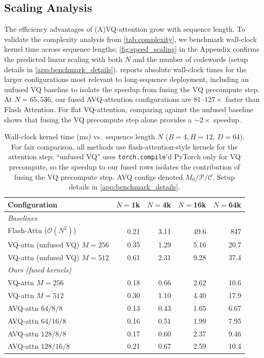 \subsection{Scaling Analysis}
\label{sec:exp_scaling}
The efficiency advantages of (A)VQ-attention grow with sequence length. To validate the complexity analysis from \cref{tab:complexity}, we benchmark wall-clock kernel time across sequence lengths; \cref{fig:speed_scaling} in the Appendix confirms the predicted linear scaling with both $N$ and the number of codewords (setup details in \cref{app:benchmark_details}).  reports absolute wall-clock times for the larger configurations most relevant to long-sequence deployment, including an unfused VQ baseline to isolate the speedup from fusing the VQ precompute step. At $N{=}65{,}536$, our fused AVQ-attention configurations are $81$--$127\times$ faster than Flash Attention. For flat VQ-attention, comparing against the unfused baseline shows that fusing the VQ precompute step alone provides a ${\sim}2\times$ speedup.
\begin{table}[h!]
\centering
\caption{Wall-clock kernel time (ms) vs.\ sequence length $N$ ($B{=}4,H{=}12$, $D{=}64$). For fair comparison, all methods use flash-attention-style kernels for the attention step; ``unfused VQ'' uses \texttt{torch.compile}'d PyTorch only for VQ precompute, so the speedup to our fused rows isolates the contribution of fusing the VQ precompute step. AVQ configs denoted $M_0/\mathcal{P}/\mathcal{C}$. Setup details in \cref{app:benchmark_details}.}
\label{tab:speed_scaling}
\begin{tabular}{lrrrr}
\toprule
\textbf{Configuration} & \multicolumn{1}{c}{$N{=}$1k} & \multicolumn{1}{c}{$N{=}$4k} & \multicolumn{1}{c}{$N{=}$16k} & \multicolumn{1}{c}{$N{=}$64k} \\
\midrule
\multicolumn{5}{l}{\textit{Baselines}} \\
Flash-Attn ($\mathcal{O}(N^2)$) & 0.21 & 3.11  & 49.6  & 847   \\
VQ-attn (unfused VQ) $M{=}256$ & 0.35 & 1.29  & 5.16  & 20.7  \\
VQ-attn (unfused VQ) $M{=}512$ & 0.61 & 2.31  & 9.28  & 37.4  \\
\midrule
\multicolumn{5}{l}{\textit{Ours (fused kernels)}} \\
VQ-attn $M{=}256$      & 0.18 & 0.66  & 2.62  & 10.6  \\
VQ-attn $M{=}512$      & 0.30 & 1.10  & 4.40  & 17.9  \\
AVQ-attn $64/8/8$      & 0.13 & 0.43  & 1.65  & 6.67  \\
AVQ-attn $64/16/8$     & 0.16 & 0.51  & 1.99  & 7.95  \\
AVQ-attn $128/8/8$     & 0.17 & 0.60  & 2.37  & 9.46  \\
AVQ-attn $128/16/8$    & 0.21 & 0.67  & 2.59  & 10.4  \\
\bottomrule
\end{tabular}
\end{table}

